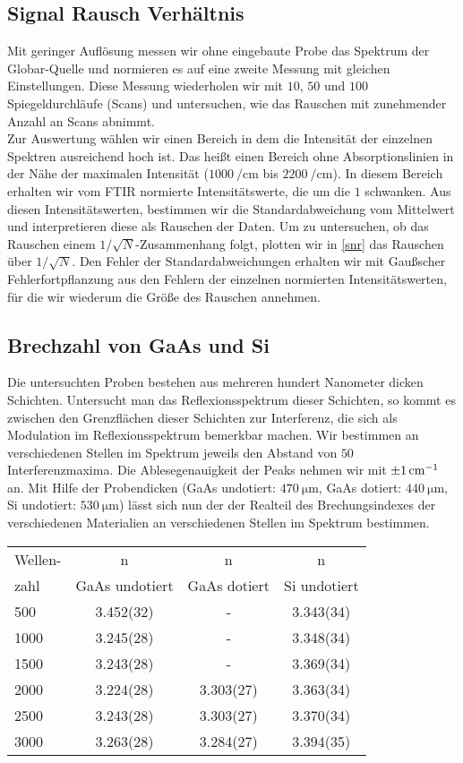 \documentclass[paper=a4,fontsize=10pt,DIV=18,twocolumn,parskip=half]{scrartcl}
\numberwithin{equation}{section}    %
\begin{document}
\subsection{Signal Rausch Verhältnis}
Mit geringer Auflösung messen wir ohne eingebaute Probe das Spektrum der Globar-Quelle und normieren es auf eine zweite Messung mit gleichen Einstellungen. Diese Messung wiederholen wir mit $10$, $50$ und $100$ Spiegeldurchläufe (Scans) und untersuchen, wie das Rauschen mit zunehmender Anzahl an Scans abnimmt.\\
Zur Auswertung wählen wir einen Bereich in dem die Intensität der einzelnen Spektren ausreichend hoch ist. Das heißt einen Bereich ohne Absorptionslinien in der Nähe der maximalen Intensität ($\SI{1000}{\per\centi\meter}$ bis $\SI{2200}{\per\centi\meter}$). In diesem Bereich erhalten wir vom FTIR normierte Intensitätswerte, die um die $1$ schwanken. Aus diesen Intensitätswerten, bestimmen wir die Standardabweichung vom Mittelwert und interpretieren diese als Rauschen der Daten. Um zu untersuchen, ob das Rauschen einem $1/\sqrt{N}$-Zusammenhang folgt, plotten wir in \ref{snr} das Rauschen über $1/\sqrt{N}$. Den Fehler der Standardabweichungen erhalten wir mit Gaußscher Fehlerfortpflanzung aus den Fehlern der einzelnen normierten Intensitätswerten, für die wir wiederum die Größe des Rauschen annehmen.


\subsection{Brechzahl von GaAs und Si}
Die untersuchten Proben bestehen aus mehreren hundert Nanometer dicken Schichten.
Untersucht man das Reflexionsspektrum dieser Schichten, so kommt es zwischen den Grenzflächen dieser Schichten zur Interferenz, die sich als Modulation im Reflexionsspektrum bemerkbar machen. 
Wir bestimmen an verschiedenen Stellen im Spektrum jeweils den Abstand von $50$ Interferenzmaxima. Die Ablesegenauigkeit der Peaks nehmen wir mit $\SI{\pm 1}{\centi\meter^{-1}}$ an.
Mit Hilfe der Probendicken (GaAs undotiert: $\SI{470}{\micro\meter}$, GaAs dotiert: $\SI{440}{\micro\meter}$, Si undotiert: $\SI{530}{\micro\meter}$) lässt sich nun der der Realteil des Brechungsindexes der verschiedenen Materialien an verschiedenen Stellen im Spektrum bestimmen.

\begin{tabular}{ l | c c c }
  Wellen- & n & n&n\\
  zahl & GaAs undotiert & GaAs dotiert & Si undotiert \\
  \hline
  500 & 3.452(32) & - & 3.343(34) \\
  1000 & 3.245(28) & - & 3.348(34) \\
  1500 & 3.243(28) & - & 3.369(34) \\
  2000 & 3.224(28) & 3.303(27) & 3.363(34) \\
  2500 & 3.243(28) & 3.303(27) & 3.370(34) \\
  3000 & 3.263(28) & 3.284(27) & 3.394(35) \\
\end{tabular}
\end{document}
